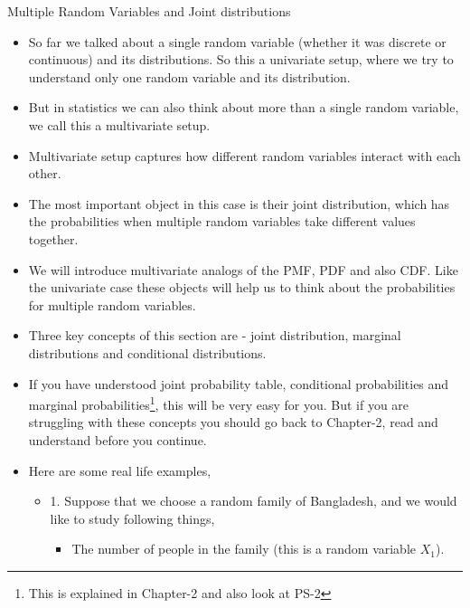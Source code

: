 \documentclass[8pt, usepdftitle=false]{beamer}
\begin{document}
\begin{frame}[allowframebreaks]{Multiple Random Variables and Joint distributions}

\begin{itemize}
  \item So far we talked about a single random variable (whether it was discrete or continuous) and its distributions. So this a \alert{univariate} setup, where we try to understand only one random variable and its distribution.

  \item But in statistics we can also think about more than a single random variable, we call this a \alert{multivariate} setup. 

  \item Multivariate setup captures how different random variables interact with each other. 

  \item The most important object in this case is their \alert{joint distribution}, which has the probabilities when multiple random variables take different values together. 


  \item We will introduce multivariate analogs of the PMF, PDF and also CDF. Like the univariate case these objects will help us to think about the probabilities for multiple random variables.

  \item Three key concepts of this section are - \alert{joint distribution, marginal distributions} and \alert{conditional distributions}.

  \item If you have understood joint probability table, conditional probabilities and marginal probabilities\footnote[frame]{This is explained in Chapter-2 and also look at PS-2}, this will be very easy for you. But if you are struggling with these concepts you should go back to Chapter-2, read and understand before you continue. 


  \item Here are some real life examples,

  \begin{itemize}
    \item 1. Suppose that we choose a \alert{random family} of Bangladesh, and we would like to study following things,

    \begin{itemize}
      \item The number of people in the family (this is a random variable $X_1$).


\end{itemize}
\end{itemize}
\end{itemize}
\end{frame}
\end{document}
